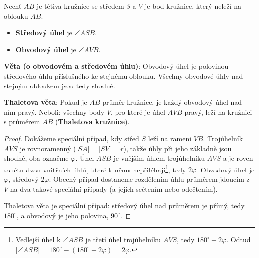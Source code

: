 \begin{definitionbox}
  Nechť $AB$ je tětiva kružnice se středem $S$ a $V$ je bod kružnice, který neleží na oblouku $AB$.
  \begin{itemize}
    \item \textbf{Středový úhel} je $\angle ASB$.
    \item \textbf{Obvodový úhel} je $\angle AVB$.
  \end{itemize}

  \textbf{Věta (o obvodovém a středovém úhlu)}: Obvodový úhel je polovinou středového úhlu příslušného ke stejnému oblouku. Všechny obvodové úhly nad stejným obloukem jsou tedy shodné.

  \textbf{Thaletova věta}: Pokud je $AB$ průměr kružnice, je každý obvodový úhel nad ním pravý. Neboli: všechny body $V$, pro které je úhel $AVB$ pravý, leží na kružnici s průměrem $AB$ (\textbf{Thaletova kružnice}).
\end{definitionbox}

\begin{proof}
  Dokážeme speciální případ, kdy střed $S$ leží na rameni $VB$. Trojúhelník $AVS$ je rovnoramenný ($|SA| = |SV| = r$), takže úhly při jeho základně jsou shodné, oba označme $\varphi$. Úhel $ASB$ je vnějším úhlem trojúhelníku $AVS$ a je roven součtu dvou vnitřních úhlů, které k němu nepřiléhají\footnote{Vedlejší úhel k $\angle ASB$ je třetí úhel trojúhelníku $AVS$, tedy $180^\circ - 2\varphi$. Odtud $|\angle ASB| = 180^\circ - (180^\circ - 2\varphi) = 2\varphi$.}, tedy $2\varphi$. Obvodový úhel je $\varphi$, středový $2\varphi$. Obecný případ dostaneme rozdělením úhlu průměrem jdoucím z $V$ na dva takové speciální případy (a jejich sečtením nebo odečtením).

  Thaletova věta je speciální případ: středový úhel nad průměrem je přímý, tedy $180^\circ$, a obvodový je jeho polovina, $90^\circ$.
\end{proof}

